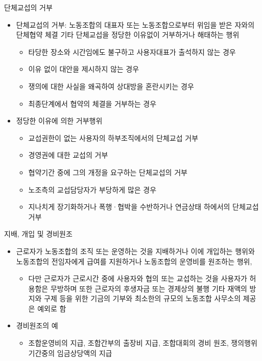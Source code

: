\documentclass[aspectratio=169,xcolor=dvipsnames,handout]{beamer}
\begin{document}
\begin{frame}[allowframebreaks]{단체교섭의 거부}
    \begin{itemize}[<+->]
        \item 단체교섭의 거부: 노동조합의 대표자 또는 노동조합으로부터 위임을 받은 자와의 단체협약 체결 기타 단체교섭을 정당한 이유없이 거부하거나 해태하는 행위
        \begin{itemize}[<+->]
            \item 타당한 장소와 시간임에도 불구하고 사용자대표가 출석하지 않는 경우
            \item 이유 없이 대안을 제시하지 않는 경우
            \item 쟁의에 대한 사실을 왜곡하여 상대방을 혼란시키는 경우
            \item 최종단계에서 협약의 체결을 거부하는 경우
        \end{itemize}
    \framebreak\relax
    \item 정당한 이유에 의한 거부행위
        \begin{itemize}[<+->]
            \item 교섭권한이 없는 사용자의 하부조직에서의 단체교섭 거부
            \item 경영권에 대한 교섭의 거부
            \item 협약기간 중에 그의 개정을 요구하는 단체교섭의 거부
            \item 노조측의 교섭담당자가 부당하게 많은 경우
            \item 지나치게 장기화하거나 폭행·협박을 수반하거나 연금상태 하에서의 단체교섭 거부
        \end{itemize}
    \end{itemize}
\end{frame}

\begin{frame}{지배, 개입 및 경비원조}
    \begin{itemize}[<+->]
        \item 근로자가 노동조합의 조직 또는 운영하는 것을 지배하거나 이에 개입하는 행위와 노동조합의 전임자에게 급여를 지원하거나 노동조합의 운영비를 원조하는 행위,
        \begin{itemize}[<+->]
            \item 다만 근로자가 근로시간 중에 사용자와 협의 또는 교섭하는 것을 사용자가 허용함은 무방하며 또한 근로자의 후생자금 또는 경제상의 불행 기타 재액의 방지와 구제 등을 위한 기금의 기부와 최소한의 규모의 노동조합 사무소의 제공은 예외로 함
        \end{itemize}
        \item 경비원조의 예
        \begin{itemize}[<+->]
            \item 조합운영비의 지급, 조합간부의 출장비 지급, 조합대회의 경비 원조, 쟁의행위 기간중의 임금상당액의 지급
        \end{itemize}
    \end{itemize}
\end{frame}
\end{document}
